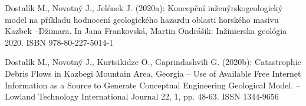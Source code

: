 {Dostalík M., Novotný J., Jelének J. (2020a): Koncepční inženýrskogeologický model na příkladu hodnocení geologického hazardu oblasti horského masivu Kazbek –Džimara. In Jana Frankovská, Martin Ondrášik: Inžinierska geológia 2020. ISBN 978-80-227-5014-1
	
Dostalík M., Novotný J., Kurtsikidze O., Gaprindashvili G. (2020b): Catastrophic Debris Flows in Kazbegi Mountain Area, Georgia – Use of Available Free Internet Information as a Source to Generate Conceptual Engineering Geological Model. – Lowland Technology International Journal 22, 1, pp. 48-63. ISSN 1344-9656
}



